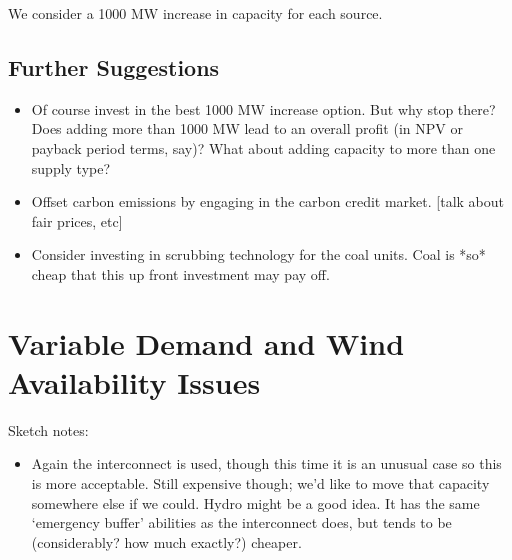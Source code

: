 \documentclass{article}
\begin{document}
    We consider a 1000 MW increase in capacity for each source.
    
    
   	\subsection{Further Suggestions}
    
    \begin{itemize}
    
    	\item Of course invest in the best 1000 MW increase option.  But why stop there?  Does adding more than 1000 MW lead to an overall profit (in NPV or payback period terms, say)?  What about adding capacity to more than one supply type?
    	
        \item Offset carbon emissions by engaging in the carbon credit market.  [talk about fair prices, etc]
        
        \item Consider investing in scrubbing technology for the coal units.  Coal is *so* cheap that this up front investment may pay off.
    
    \end{itemize}
    
    
    
    \section{Variable Demand and Wind Availability Issues}
	
    \begin{table}[H]
    	\centering
    \end{table}
    
    \begin{figure}[H]
        \centering
    \end{figure}
    
    
    Sketch notes:
    
    \begin{itemize}
    	
        \item  Again the interconnect is used, though this time it is an unusual case so this is more acceptable.  Still expensive though; we'd like to move that capacity somewhere else if we could.  Hydro might be a good idea.  It has the same `emergency buffer' abilities as the interconnect does, but tends to be (considerably? how much exactly?) cheaper.
    
    \end{itemize}
    
\end{document}
